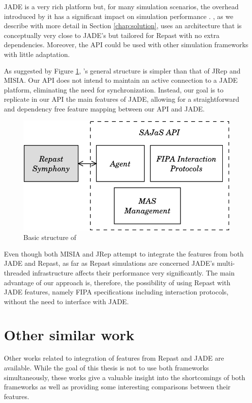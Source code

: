 JADE is a very rich platform but, for many simulation scenarios, the overhead introduced by it has a significant impact on simulation performance \cite{mengistu2008scalability}. \apiname{}, as we describe with more detail in Section \ref{chap:solution}, uses an architecture that is conceptually very close to JADE's but tailored for Repast with no extra dependencies. Moreover, the API could be used with other simulation frameworks with little adaptation.

As suggested by Figure \ref{fig:related-repacl}, \apiname{}'s general structure is simpler than that of JRep and MISIA. Our API does not intend to maintain an active connection to a JADE platform, eliminating the need for synchronization. Instead, our goal is to replicate in our API the main features of JADE, allowing for a straightforward and dependency free feature mapping between our API and JADE.

\begin{figure}
	\centering
	\includegraphics[width=0.5\linewidth]{figures/repacl.pdf}
	\caption{Basic structure of \apiname{}}
	\label{fig:related-repacl}
\end{figure}

Even though both MISIA and JRep attempt to integrate the features from both JADE and Repast, as far as Repast simulations are concerned JADE's multi-threaded infrastructure affects their performance very significantly. The main advantage of our approach is, therefore, the possibility of using Repast with JADE features, namely FIPA specifications including interaction protocols, without the need to interface with JADE. 

\section{Other similar work}
Other works related to integration of features from Repast and JADE are available. While the goal of this thesis is not to use both frameworks simultaneously, these works give a valuable insight into the shortcomings of both frameworks as well as providing some interesting comparisons between their features. 

